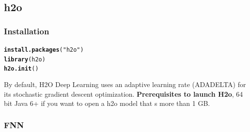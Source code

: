 \documentclass[letter,8pt]{article}\usepackage[]{graphicx}\usepackage[]{color}
\makeatletter
\newcommand{\hlstr}[1]{\textcolor[rgb]{0.192,0.494,0.8}{#1}}%
\newcommand{\hlstd}[1]{\textcolor[rgb]{0.345,0.345,0.345}{#1}}%
\newcommand{\hlkwd}[1]{\textcolor[rgb]{0.737,0.353,0.396}{\textbf{#1}}}%
\newenvironment{kframe}{%
 \def\at@end@of@kframe{}%
 \ifinner\ifhmode%
  \def\at@end@of@kframe{\end{minipage}}%
  \begin{minipage}{\columnwidth}%
 \fi\fi%
 \def\FrameCommand##1{\hskip\@totalleftmargin \hskip-\fboxsep
 \colorbox{shadecolor}{##1}\hskip-\fboxsep
     \hskip-\linewidth \hskip-\@totalleftmargin \hskip\columnwidth}%
 \MakeFramed {\advance\hsize-\width
   \@totalleftmargin\z@ \linewidth\hsize
   \@setminipage}}%
 {\par\unskip\endMakeFramed%
 \at@end@of@kframe}
\newenvironment{knitrout}{}{} %
\makeatother
\begin{document}
\subsection{h2o}
\subsubsection{Installation}
\begin{knitrout}
\color{fgcolor}\begin{kframe}
\begin{alltt}
\hlkwd{install.packages}\hlstd{(}\hlstr{"h2o"}\hlstd{)}
\hlkwd{library}\hlstd{(h2o)}
\hlkwd{h2o.init}\hlstd{()}
\end{alltt}
\end{kframe}
\end{knitrout}
By default, H2O Deep Learning uses an adaptive learning rate (ADADELTA) for its stochastic gradient descent optimization.
\textbf{Prerequisites to launch H2o}, 64 bit Java 6+ if you want to open a h2o model that s more than 1 GB. 
\subsubsection{FNN}
\end{document}
